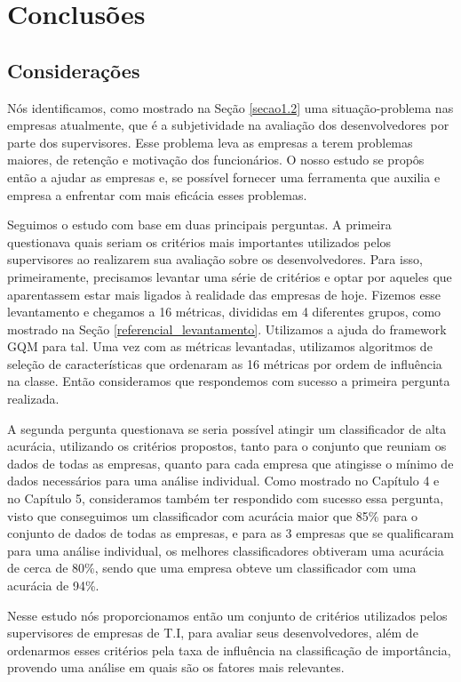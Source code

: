 \chapter[Conclusões]{Conclusões}

\section{Considerações}
Nós identificamos, como mostrado na Seção \ref{secao1.2} uma situação-problema nas empresas atualmente, que é a subjetividade na avaliação dos desenvolvedores por parte dos supervisores. Esse problema leva as empresas a terem problemas maiores, de retenção e motivação dos funcionários. O nosso estudo se propôs então a ajudar as empresas e, se possível fornecer uma ferramenta que auxilia e empresa a enfrentar com mais eficácia esses problemas.

Seguimos o estudo com base em duas principais perguntas. A primeira questionava quais seriam os critérios mais importantes utilizados pelos supervisores ao realizarem sua avaliação sobre os desenvolvedores. Para isso, primeiramente, precisamos levantar uma série de critérios e optar por aqueles que aparentassem estar mais ligados à realidade das empresas de hoje. Fizemos esse levantamento e chegamos a 16 métricas, divididas em 4 diferentes grupos, como mostrado na Seção \ref{referencial_levantamento}. Utilizamos a ajuda do framework GQM para tal. Uma vez com as métricas levantadas, utilizamos algoritmos de seleção de características que ordenaram as 16 métricas por ordem de influência na classe. Então consideramos que respondemos com sucesso a primeira pergunta realizada.

A segunda pergunta questionava se seria possível atingir um classificador de alta acurácia, utilizando os critérios propostos, tanto para o conjunto que reuniam os dados de todas as empresas, quanto para cada empresa que atingisse o mínimo de dados necessários para uma análise individual. Como mostrado no Capítulo 4 e no Capítulo 5, consideramos também ter respondido com sucesso essa pergunta, visto que conseguimos um classificador com acurácia maior que 85\% para o conjunto de dados de todas as empresas, e para as 3 empresas que se qualificaram para uma análise individual, os melhores classificadores obtiveram uma acurácia de cerca de 80\%, sendo que uma empresa obteve um classificador com uma acurácia de 94\%.

Nesse estudo nós proporcionamos então um conjunto de critérios utilizados pelos supervisores de empresas de T.I, para avaliar seus desenvolvedores, além de ordenarmos esses critérios pela taxa de influência na classificação de importância, provendo uma análise em quais são os fatores mais relevantes.

